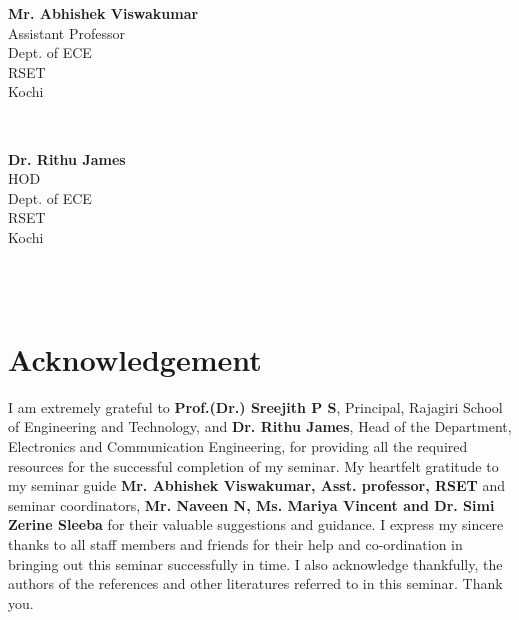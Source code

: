 \documentclass[11pt]{report}
\begin{document}
\begin{minipage}{0.45\textwidth}
\begin{flushleft} \large
\textbf{Mr. Abhishek Viswakumar}\\
Assistant Professor\\
Dept. of ECE\\
RSET\\
Kochi
\end{flushleft}
\end{minipage}
~
\begin{minipage}{0.4\textwidth}
\begin{flushright} \large
\textbf{Dr. Rithu James}\\
HOD\\
Dept. of ECE\\
RSET\\
Kochi
\end{flushright}
\end{minipage}\\
~

\chapter*{Acknowledgement}
\setcounter{page}{1}
I am extremely grateful to \textbf{Prof.(Dr.) Sreejith P S}, Principal, Rajagiri School of Engineering and Technology, and \textbf{Dr. Rithu James}, Head of the Department, Electronics and Communication Engineering, for providing all the required resources for the successful completion of my seminar. My heartfelt gratitude to my seminar guide \textbf{Mr. Abhishek Viswakumar, Asst. professor, RSET} and seminar coordinators, \textbf{Mr. Naveen N, Ms. Mariya Vincent and Dr. Simi Zerine Sleeba} for their valuable suggestions and guidance. I express my sincere thanks to all staff members and friends for their help and co-ordination in bringing out this seminar successfully in time. I also acknowledge thankfully, the authors of the references and other literatures referred to in this seminar. Thank you.
\end{document}
